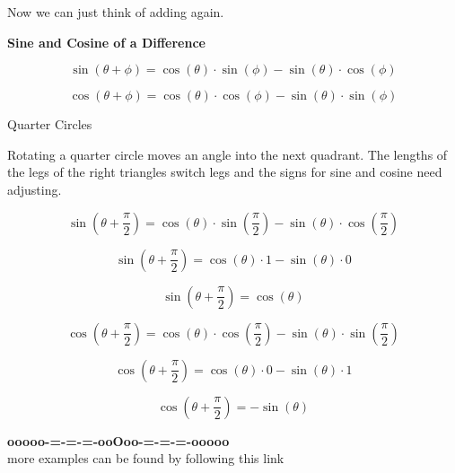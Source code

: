 \documentclass{ximera}
\begin{document}
Now we can just think of adding again.





\begin{theorem}  \textbf{\textcolor{-red!75!green}{Sine and Cosine of a Difference}}

\[  \sin(\theta + \phi) = \cos(\theta) \cdot \sin(\phi) - \sin(\theta) \cdot \cos(\phi)  \]

\[  \cos(\theta + \phi) = \cos(\theta) \cdot \cos(\phi) - \sin(\theta) \cdot \sin(\phi)  \]

\end{theorem}













\begin{example}  Quarter Circles 


Rotating a quarter circle moves an angle into the next quadrant.  The lengths of the legs of the right triangles switch legs and the signs for sine and cosine need adjusting.



\[  \sin\left( \theta + \frac{\pi}{2} \right) = \cos(\theta) \cdot \sin\left( \frac{\pi}{2} \right) - \sin(\theta) \cdot \cos\left( \frac{\pi}{2} \right)  \]



\[  \sin\left( \theta + \frac{\pi}{2} \right) = \cos(\theta) \cdot 1 - \sin(\theta) \cdot 0  \]

\[  \sin\left( \theta + \frac{\pi}{2} \right) = \cos(\theta)  \]



\[  \cos\left( \theta + \frac{\pi}{2} \right) = \cos(\theta) \cdot \cos\left( \frac{\pi}{2} \right) - \sin(\theta) \cdot \sin\left( \frac{\pi}{2} \right)  \]

\[  \cos\left( \theta + \frac{\pi}{2} \right) = \cos(\theta) \cdot 0 - \sin(\theta) \cdot 1  \]

\[  \cos\left( \theta + \frac{\pi}{2} \right) =  - \sin(\theta)   \]




\end{example}














\begin{onlineOnly}
\begin{center}
\textbf{\textcolor{green!50!black}{ooooo-=-=-=-ooOoo-=-=-=-ooooo}} \\

more examples can be found by following this link\\ 

\end{center}
\end{onlineOnly}
\end{document}
